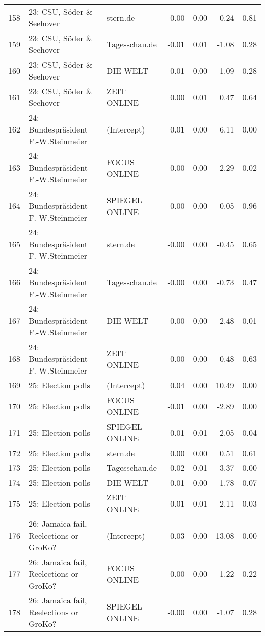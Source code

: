 \begin{table}[ht]
{\begin{tabular}{rllrrrr}
  158 & 23: CSU, Söder \& Seehover & stern.de & -0.00 & 0.00 & -0.24 & 0.81 \\ 
  159 & 23: CSU, Söder \& Seehover & Tagesschau.de & -0.01 & 0.01 & -1.08 & 0.28 \\ 
  160 & 23: CSU, Söder \& Seehover & DIE WELT & -0.01 & 0.00 & -1.09 & 0.28 \\ 
  161 & 23: CSU, Söder \& Seehover & ZEIT ONLINE & 0.00 & 0.01 & 0.47 & 0.64 \\ 
  162 & 24: Bundespräsident F.-W.Steinmeier & (Intercept) & 0.01 & 0.00 & 6.11 & 0.00 \\ 
  163 & 24: Bundespräsident F.-W.Steinmeier & FOCUS ONLINE & -0.00 & 0.00 & -2.29 & 0.02 \\ 
  164 & 24: Bundespräsident F.-W.Steinmeier & SPIEGEL ONLINE & -0.00 & 0.00 & -0.05 & 0.96 \\ 
  165 & 24: Bundespräsident F.-W.Steinmeier & stern.de & -0.00 & 0.00 & -0.45 & 0.65 \\ 
  166 & 24: Bundespräsident F.-W.Steinmeier & Tagesschau.de & -0.00 & 0.00 & -0.73 & 0.47 \\ 
  167 & 24: Bundespräsident F.-W.Steinmeier & DIE WELT & -0.00 & 0.00 & -2.48 & 0.01 \\ 
  168 & 24: Bundespräsident F.-W.Steinmeier & ZEIT ONLINE & -0.00 & 0.00 & -0.48 & 0.63 \\ 
  169 & 25: Election polls & (Intercept) & 0.04 & 0.00 & 10.49 & 0.00 \\ 
  170 & 25: Election polls & FOCUS ONLINE & -0.01 & 0.00 & -2.89 & 0.00 \\ 
  171 & 25: Election polls & SPIEGEL ONLINE & -0.01 & 0.01 & -2.05 & 0.04 \\ 
  172 & 25: Election polls & stern.de & 0.00 & 0.00 & 0.51 & 0.61 \\ 
  173 & 25: Election polls & Tagesschau.de & -0.02 & 0.01 & -3.37 & 0.00 \\ 
  174 & 25: Election polls & DIE WELT & 0.01 & 0.00 & 1.78 & 0.07 \\ 
  175 & 25: Election polls & ZEIT ONLINE & -0.01 & 0.01 & -2.11 & 0.03 \\ 
  176 & 26: Jamaica fail, Reelections or GroKo? & (Intercept) & 0.03 & 0.00 & 13.08 & 0.00 \\ 
  177 & 26: Jamaica fail, Reelections or GroKo? & FOCUS ONLINE & -0.00 & 0.00 & -1.22 & 0.22 \\ 
  178 & 26: Jamaica fail, Reelections or GroKo? & SPIEGEL ONLINE & -0.00 & 0.00 & -1.07 & 0.28 \\ 

\end{tabular}}
\end{table}
